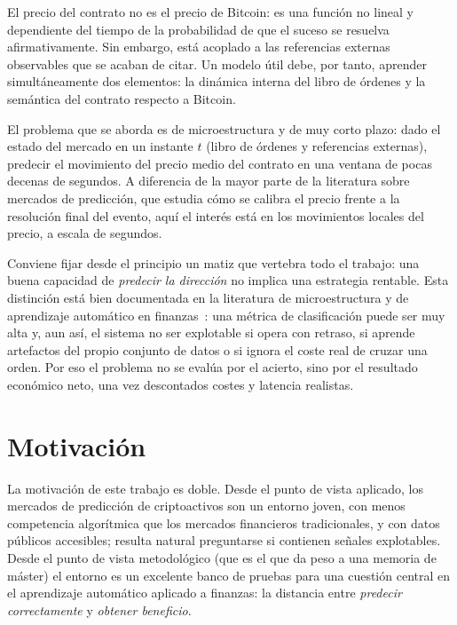 El precio del contrato no es el precio de Bitcoin: es una función no lineal y dependiente
del tiempo de la probabilidad de que el suceso se resuelva afirmativamente. Sin embargo,
está acoplado a las referencias externas observables que se acaban de citar. Un modelo
útil debe, por tanto, aprender simultáneamente dos elementos: la dinámica interna del libro de
órdenes y la semántica del contrato respecto a Bitcoin.

El problema que se aborda es de microestructura y de muy corto plazo: dado el estado del
mercado en un instante $t$ (libro de órdenes y referencias externas), predecir el
movimiento del precio medio del contrato en una ventana de pocas decenas de segundos. A
diferencia de la mayor parte de la literatura sobre mercados de predicción, que estudia
cómo se calibra el precio frente a la resolución final del evento, aquí el interés está en
los movimientos locales del precio, a escala de segundos.

Conviene fijar desde el principio un matiz que vertebra todo el trabajo: una buena
capacidad de \emph{predecir la dirección} no implica una estrategia rentable. Esta
distinción está bien documentada en la literatura de microestructura y de aprendizaje
automático en finanzas~\cite{kearns2013,lopezdeprado2018,bailey2014deflated}: una métrica de
clasificación puede ser muy alta y, aun así, el sistema no ser explotable si opera con
retraso, si aprende artefactos del propio conjunto de datos o si ignora el coste real de
cruzar una orden. Por eso el problema no se evalúa por el acierto, sino por el resultado
económico neto, una vez descontados costes y latencia realistas.

\section{Motivación}

La motivación de este trabajo es doble. Desde el punto de vista aplicado, los mercados de
predicción de criptoactivos son un entorno joven, con menos competencia algorítmica que
los mercados financieros tradicionales, y con datos públicos accesibles; resulta natural
preguntarse si contienen señales explotables. Desde el punto de vista metodológico (que es
el que da peso a una memoria de máster) el entorno es un excelente banco de pruebas para
una cuestión central en el aprendizaje automático aplicado a finanzas: la distancia entre
\emph{predecir correctamente} y \emph{obtener beneficio}.

